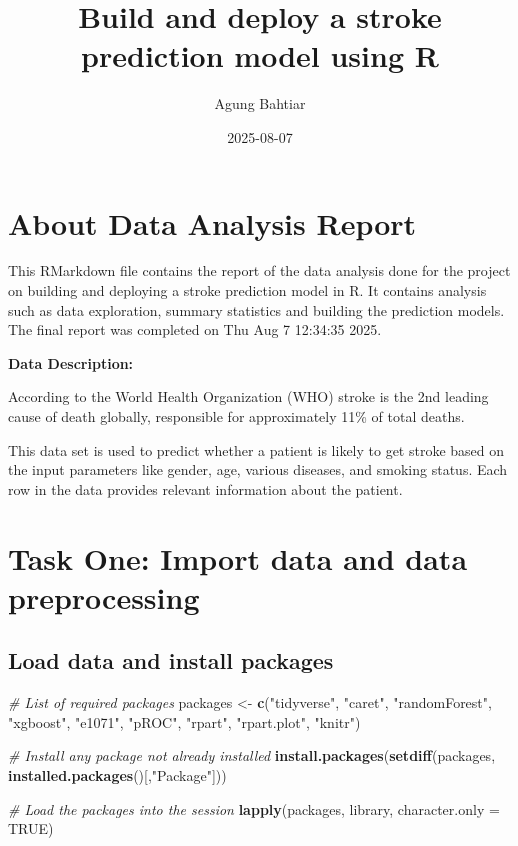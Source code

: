 \documentclass[
]{article}
\title{Build and deploy a stroke prediction model using R}
\author{Agung Bahtiar}
\date{2025-08-07}
\newenvironment{Shaded}{\begin{snugshade}}{\end{snugshade}}
\newcommand{\AttributeTok}[1]{\textcolor[rgb]{0.13,0.29,0.53}{#1}}
\newcommand{\CommentTok}[1]{\textcolor[rgb]{0.56,0.35,0.01}{\textit{#1}}}
\newcommand{\ConstantTok}[1]{\textcolor[rgb]{0.56,0.35,0.01}{#1}}
\newcommand{\FunctionTok}[1]{\textcolor[rgb]{0.13,0.29,0.53}{\textbf{#1}}}
\newcommand{\NormalTok}[1]{#1}
\newcommand{\OtherTok}[1]{\textcolor[rgb]{0.56,0.35,0.01}{#1}}
\newcommand{\StringTok}[1]{\textcolor[rgb]{0.31,0.60,0.02}{#1}}
\begin{document}
\maketitle

\section{About Data Analysis Report}\label{about-data-analysis-report}

This RMarkdown file contains the report of the data analysis done for
the project on building and deploying a stroke prediction model in R. It
contains analysis such as data exploration, summary statistics and
building the prediction models. The final report was completed on Thu
Aug 7 12:34:35 2025.

\textbf{Data Description:}

According to the World Health Organization (WHO) stroke is the 2nd
leading cause of death globally, responsible for approximately 11\% of
total deaths.

This data set is used to predict whether a patient is likely to get
stroke based on the input parameters like gender, age, various diseases,
and smoking status. Each row in the data provides relevant information
about the patient.

\section{Task One: Import data and data
preprocessing}\label{task-one-import-data-and-data-preprocessing}

\subsection{Load data and install
packages}\label{load-data-and-install-packages}

\begin{Shaded}
\begin{Highlighting}[]
\CommentTok{\# List of required packages}
\NormalTok{packages }\OtherTok{\textless{}{-}} \FunctionTok{c}\NormalTok{(}\StringTok{"tidyverse"}\NormalTok{, }\StringTok{"caret"}\NormalTok{, }\StringTok{"randomForest"}\NormalTok{, }\StringTok{"xgboost"}\NormalTok{, }\StringTok{"e1071"}\NormalTok{, }\StringTok{"pROC"}\NormalTok{, }\StringTok{"rpart"}\NormalTok{, }\StringTok{"rpart.plot"}\NormalTok{, }\StringTok{"knitr"}\NormalTok{)}

\CommentTok{\# Install any package not already installed}
\FunctionTok{install.packages}\NormalTok{(}\FunctionTok{setdiff}\NormalTok{(packages, }\FunctionTok{installed.packages}\NormalTok{()[,}\StringTok{"Package"}\NormalTok{]))}

\CommentTok{\# Load the packages into the session}
\FunctionTok{lapply}\NormalTok{(packages, library, }\AttributeTok{character.only =} \ConstantTok{TRUE}\NormalTok{)}
\end{Highlighting}
\end{Shaded}
\end{document}
